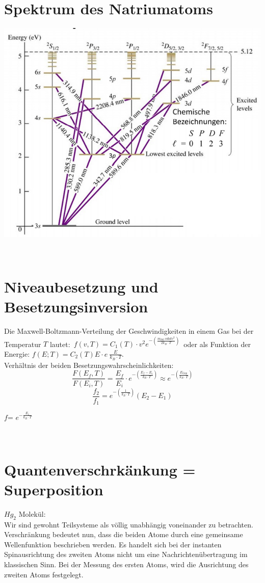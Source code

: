 \section{Spektrum des Natriumatoms}
\begin{center}
	\includegraphics[scale = 0.3]{../fig/spektrum_na.jpg}
\end{center}
\
\\
\section{Niveaubesetzung und Besetzungsinversion}
Die Maxwell-Boltzmann-Verteilung der Geschwindigkeiten in einem Gas bei der Temperatur $T$ lautet:\
 $f(v,T)=C_1(T)\cdot v^2 e^{-\left( \frac{m_{kül} \ cdot v^2}{2k_B\cdot T} \right) }$\
 oder als Funktion der Energie: $f(E;T)=C_2(T)E\cdot e~{ \frac{E}{k_B\cdot T}}$.\
 \\
 Verhältnis der beiden Besetzungswahrscheinlichkeiten:
 \[
 	\frac{F(E_f,T)}{F(E_i,T)}=\frac{E_f}{E_i}\cdot e^{-\left( \frac{E_f-E_i}{k_B\cdot T}\right) }
 	\approx	
 	e^{-\left( \frac{E_{Gap}}{k_B\cdot T}\right) }
 \]
 \[
 	\frac{f_2}{f_1}=e^{-\left( \frac{1}{k_B\cdot T}  \right) }\left(  E_2-E_1 \right) 
 \]
 \begin{footnotesize}
 	$f$=	$e^{- \frac{E_1}{k_B \cdot T}}$\\
 \end{footnotesize}
 \
 \\
 \section{Quantenverschrkänkung = Superposition}
 $Hg_2$ Molekül:\\
 Wir sind gewohnt Teilsysteme als völlig unabhängig voneinander zu betrachten. Verschränkung bedeutet nun, dass die beiden Atome durch eine gemeinsame Wellenfunktion beschrieben werden. Es handelt sich bei der instanten Spinausrichtung des zweiten Atoms nicht um eine Nachrichtenübertragung im klassischen Sinn. Bei der Messung des ersten Atoms, wird die Ausrichtung des zweiten Atoms festgelegt.\
 \\
